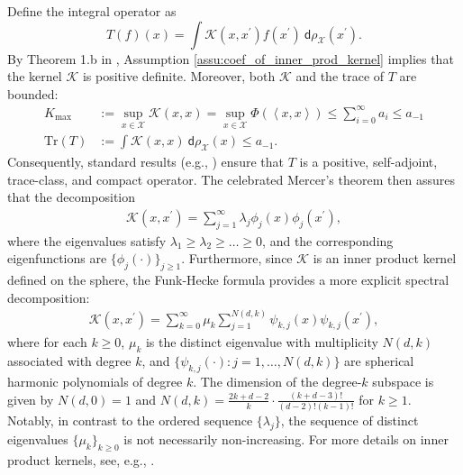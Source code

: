 \documentclass{article}
\theoremstyle{plain}
\theoremstyle{definition}
\theoremstyle{remark}
\newcommand{\calX}{\mathcal{X}}
\begin{document}
Define the integral operator as
\begin{equation}\label{def_T}
    T(f)(x)=\int \mathscr{K}(x, x^{\prime}) f(x^{\prime}) ~\mathsf{d} \rho_{\calX}(x^{\prime}). 
\end{equation}
By Theorem 1.b in \cite{gneiting2013strictly}, Assumption \ref{assu:coef_of_inner_prod_kernel} implies that the kernel $\mathscr{K}$ is positive definite. Moreover, both $\mathscr{K}$ and the trace of $T$ are bounded:
\begin{equation*}
\begin{aligned}
    K_{\max}&:=\sup_{x \in \mathcal X} \mathscr{K}(x, x) 
    = \sup_{x \in \mathcal X} \Phi(\left\langle x, x \right\rangle) 
    \leq \sum\nolimits_{i=0}^{\infty} a_i \leq a_{-1}\\
    \text{Tr}(T)&:=\int \mathscr{K}(x, x)  ~\mathsf{d} \rho_{\calX}(x) \leq a_{-1}. 
\end{aligned}
\end{equation*}
Consequently, standard results (e.g., \cite{steinwart2012mercer}) ensure that $T$ is a positive, self-adjoint, trace-class, and compact operator.  
%
The celebrated Mercer's theorem then assures that the decomposition
\begin{align}\label{eqn:mercer_decomp}
    \mathscr{K}(x, x^{\prime})=\sum_{j=1}^{\infty}\lambda_{j}\phi_{j}(x)\phi_{j}( x^{\prime}),
\end{align}
where the eigenvalues satisfy $\lambda_{1} \geq \lambda_{2} \geq \ldots \geq 0$, and the corresponding eigenfunctions are $\{\phi_{j}(\cdot)\}_{j\geq 1}$. 
Furthermore, since $\mathscr{K}$ is an inner product kernel defined on the sphere, the Funk-Hecke formula provides a more explicit spectral decomposition:
\begin{equation}\label{spherical_decomposition_of_inner_main}
\begin{aligned}
\mathscr{K}(x,x^\prime) = \sum_{k=0}^{\infty} \mu_{k} \sum_{j=1}^{N(d, k)} \psi_{k, j}(x) \psi_{k, j}\left(x^\prime\right),
\end{aligned}
\end{equation}
where for each $k\geq 0$, $\mu_{k}$ is the distinct eigenvalue with multiplicity $N(d, k)$ associated with degree $k$, and 
$\{\psi_{k, j}(\cdot): j=1,\ldots, N(d, k)\}$ are spherical harmonic polynomials of degree $k$. 
The dimension of the degree-$k$ subspace is given by $N(d,0)=1$ and $N(d, k) = \frac{2k+d-2}{k} \cdot \frac{(k+d-3)!}{(d-2)!(k-1)!}$ for $k\geq 1$. 
Notably, in contrast to the ordered sequence $\{\lambda_j\}$, the sequence of distinct eigenvalues $\{\mu_{k}\}_{k \geq 0}$ is not necessarily non-increasing. 
For more details on inner product kernels, see, e.g.,  \citep{gallier2009notes, ghorbani2021linearized}.
\end{document}
